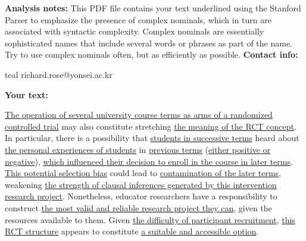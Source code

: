 \documentclass{article}
\begin{document}
\indent \textbf{Analysis notes:} \newline
\indent This PDF file contains your text underlined using the Stanford Parser to emphasize the presence of complex nominals, which in turn are associated with syntactic complexity. Complex nominals are essentially sophisticated names that include several words or phrases as part of the name. Try to use complex nominals often, but as efficiently as possible.
\newline
\newline
\indent \textbf{Contact info:} \newline
\indent \begin{color}{teal} richard.rose@yonsei.ac.kr \end{color} \newline
\newline
\newline
\indent \textbf{Your text:} 
\indent


\uline{The operation of \uline{\uline{several university course terms} as \uline{arms of \uline{a randomized controlled trial}}}} may also constitute stretching \uline{the meaning of \uline{the RCT concept}}. In particular, there is a possibility that \uline{students in successive terms} heard about \uline{\uline{the personal experiences} of students} in \uline{\uline{previous terms}} (\uline{either positive or negative}), \uline{which influenced their decision to enroll in \uline{the course in later terms}}. \uline{This potential selection bias} could lead to \uline{contamination of \uline{the later terms}}, weakening \uline{the strength of \uline{clausal inferences generated by \uline{this intervention research project}}}. Nonetheless, educator researchers have a responsibility to construct \uline{\uline{the most valid and reliable research project} they can}, given the resources available to them. Given \uline{the difficulty of participant recruitment}, \uline{this RCT structure} appears to constitute \uline{a suitable and accessible option}. 
\end{document}
